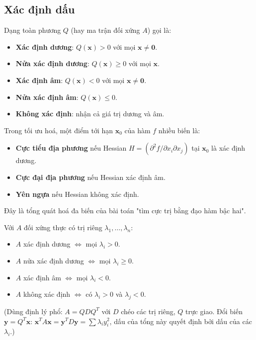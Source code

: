 \documentclass[12pt,a4paper]{article}
\begin{document}
\subsection{Xác định dấu}

\begin{dinhnghia}
  Dạng toàn phương $Q$ (hay ma trận đối xứng $A$) gọi là:
  \begin{itemize}
    \item \textbf{Xác định dương}: $Q(\mathbf{x}) > 0$ với mọi $\mathbf{x} \ne \mathbf{0}$.
    \item \textbf{Nửa xác định dương}: $Q(\mathbf{x}) \ge 0$ với mọi $\mathbf{x}$.
    \item \textbf{Xác định âm}: $Q(\mathbf{x}) < 0$ với mọi $\mathbf{x} \ne \mathbf{0}$.
    \item \textbf{Nửa xác định âm}: $Q(\mathbf{x}) \le 0$.
    \item \textbf{Không xác định}: nhận cả giá trị dương và âm.
  \end{itemize}
\end{dinhnghia}

\begin{ynghia}[title={Tại sao quan tâm dấu?}]
Trong tối ưu hoá, một điểm tới hạn $\mathbf{x}_0$ của hàm $f$ nhiều biến là:
\begin{itemize}
  \item \textbf{Cực tiểu địa phương} nếu Hessian $H = (\partial^2 f / \partial x_i \partial x_j)$ tại $\mathbf{x}_0$ là xác định dương.
  \item \textbf{Cực đại địa phương} nếu Hessian xác định âm.
  \item \textbf{Yên ngựa} nếu Hessian không xác định.
\end{itemize}
Đây là tổng quát hoá đa biến của bài toán "tìm cực trị bằng đạo hàm bậc hai".
\end{ynghia}

\begin{dinhly}[title={Tiêu chuẩn trị riêng}]
Với $A$ đối xứng thực có trị riêng $\lambda_1, \ldots, \lambda_n$:
\begin{itemize}
  \item $A$ xác định dương $\Leftrightarrow$ mọi $\lambda_i > 0$.
  \item $A$ nửa xác định dương $\Leftrightarrow$ mọi $\lambda_i \ge 0$.
  \item $A$ xác định âm $\Leftrightarrow$ mọi $\lambda_i < 0$.
  \item $A$ không xác định $\Leftrightarrow$ có $\lambda_i > 0$ và $\lambda_j < 0$.
\end{itemize}
(Dùng định lý phổ: $A = QDQ^T$ với $D$ chéo các trị riêng, $Q$ trực giao. Đổi biến $\mathbf{y} = Q^T \mathbf{x}$: $\mathbf{x}^T A \mathbf{x} = \mathbf{y}^T D \mathbf{y} = \sum \lambda_i y_i^2$, dấu của tổng này quyết định bởi dấu của các $\lambda_i$.)
\end{dinhly}
\end{document}
